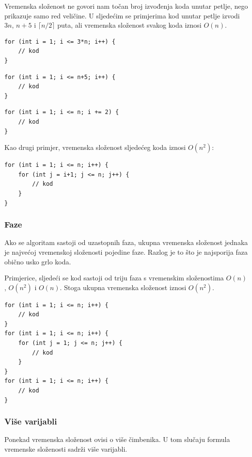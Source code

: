 Vremenska složenost ne govori nam točan broj
izvođenja koda unutar petlje,
nego prikazuje samo red veličine.
U sljedećim se primjerima kod unutar petlje
izvodi $3n$, $n+5$ i $\lceil n/2 \rceil$ puta,
ali vremenska složenost svakog koda iznosi $O(n)$.

\begin{lstlisting}
for (int i = 1; i <= 3*n; i++) {
    // kod
}
\end{lstlisting}

\begin{lstlisting}
for (int i = 1; i <= n+5; i++) {
    // kod
}
\end{lstlisting}

\begin{lstlisting}
for (int i = 1; i <= n; i += 2) {
    // kod
}
\end{lstlisting}

Kao drugi primjer,
vremenska složenost sljedećeg koda iznosi $O(n^2)$:

\begin{lstlisting}
for (int i = 1; i <= n; i++) {
    for (int j = i+1; j <= n; j++) {
        // kod
    }
}
\end{lstlisting}

\subsubsection*{Faze}

Ako se algoritam sastoji od uzastopnih faza,
ukupna vremenska složenost jednaka je najvećoj
vremenskoj složenosti pojedine faze.
Razlog je to što je najsporija
faza obično usko grlo koda.

Primjerice, sljedeći se kod sastoji
od triju faza s vremenskim složenostima
$O(n)$, $O(n^2)$ i $O(n)$.
Stoga ukupna vremenska složenost iznosi $O(n^2)$.

\begin{lstlisting}
for (int i = 1; i <= n; i++) {
    // kod
}
for (int i = 1; i <= n; i++) {
    for (int j = 1; j <= n; j++) {
        // kod
    }
}
for (int i = 1; i <= n; i++) {
    // kod
}
\end{lstlisting}

\subsubsection*{Više varijabli}

Ponekad vremenska složenost ovisi o
više čimbenika.
U tom slučaju formula vremenske složenosti
sadrži više varijabli.

